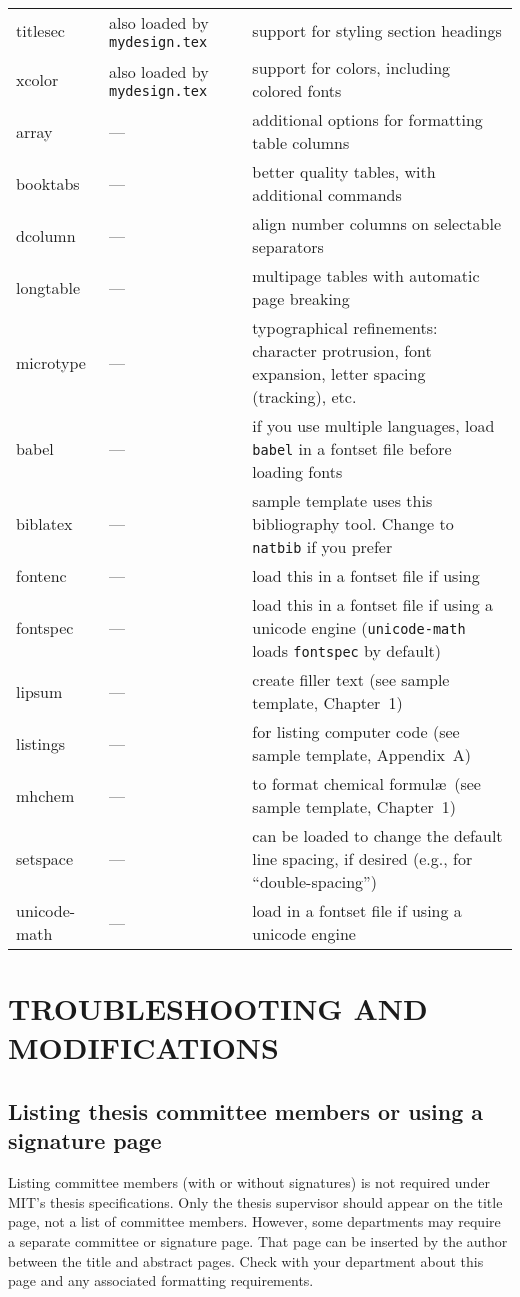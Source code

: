 \documentclass[11pt]{article}
\newcommand*\pdfTeX{\hologo{pdfTeX}}
\begin{document}
\begin{table}
{\begin{tabular*}{\textwidth}{>{\ttfamily}l<{}@{\extracolsep{\fill}}p{18em} p{22em} }
titlesec   & also loaded by \texttt{mydesign.tex} 		& support for styling section headings \\
xcolor	   & also loaded by \texttt{mydesign.tex} 		& support for colors, including colored fonts \\[0.7em]
array	   & --- & additional options for formatting table columns \\
booktabs   & --- & better quality tables, with additional commands \\
dcolumn    & --- & align number columns on selectable separators \\
longtable  & --- & multipage tables with automatic page breaking \\
microtype  & --- & typographical refinements: character protrusion, font expansion, letter spacing (tracking), etc. \\
\midrule
babel	 & --- & if you use multiple languages, load \texttt{babel} in a fontset file before loading fonts \\
biblatex & --- & sample template uses this bibliography tool. Change to \texttt{natbib} if you prefer\\
fontenc	 & --- & load this in a fontset file if using \pdfTeX\\
fontspec & --- & load this in a fontset file if using a unicode engine (\texttt{unicode-math} loads \texttt{fontspec} by default)\\
lipsum   & --- & create filler text (see sample template, Chapter~1) \\
listings & --- & for listing computer code (see sample template, Appendix~A) \\
mhchem   & --- & to format chemical formul\ae\ (see sample template, Chapter~1) \\
setspace & --- & can be loaded to change the default line spacing, if desired (e.g., for ``double-spacing'')\\
unicode-math & --- & load in a fontset file if using a unicode engine\\
\bottomrule
\end{tabular*}}%
\end{table}

\section{TROUBLESHOOTING AND MODIFICATIONS}

\subsection{Listing thesis committee members or using a signature page}
Listing committee members (with or without signatures) is not required under MIT's thesis specifications. Only the thesis supervisor should appear on the title page, not a list of committee members.  However, some departments may require a separate committee or signature page.  That page can be inserted by the author between the title and abstract pages.  Check with your department about this page and any associated formatting requirements. 
\end{document}
